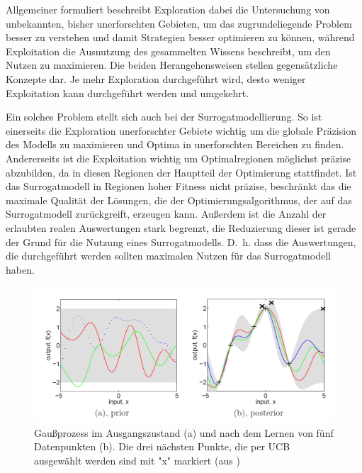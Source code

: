 Allgemeiner formuliert beschreibt Exploration dabei die Untersuchung von unbekannten, bisher unerforschten Gebieten, um das zugrundeliegende Problem besser zu verstehen und damit Strategien besser optimieren zu können, während Exploitation die Ausnutzung des gesammelten Wissens beschreibt, um den Nutzen zu maximieren.
Die beiden Herangehensweisen stellen gegensätzliche Konzepte dar.
Je mehr Exploration durchgeführt wird, desto weniger Exploitation kann durchgeführt werden und umgekehrt.

Ein solches Problem stellt sich auch bei der Surrogatmodellierung.
So ist einerseits die Exploration unerforschter Gebiete wichtig um die globale Präzision des Modells zu maximieren und Optima in unerforschten Bereichen zu finden.
Andererseits ist die Exploitation wichtig um Optimalregionen möglichst präzise abzubilden, da in diesen Regionen der Hauptteil der Optimierung stattfindet.
Ist das Surrogatmodell in Regionen hoher Fitness nicht präzise, beschränkt das die maximale Qualität der Lösungen, die der Optimierungsalgorithmus, der auf das Surrogatmodell zurückgreift, erzeugen kann.
Außerdem ist die Anzahl der erlaubten realen Auswertungen stark begrenzt, die Reduzierung dieser ist gerade der Grund für die Nutzung eines Surrogatmodells.
D.~h. dass die Auswertungen, die durchgeführt werden sollten maximalen Nutzen für das Surrogatmodell haben.

\begin{figure}[h]
	\centering
	\includegraphics[width=1\linewidth]{bilder/ucb}
	\caption[Gaußprozess im Ausgangszustand (a) und nach dem Lernen von fünf Datenpunkten (b).]{Gaußprozess im Ausgangszustand (a) und nach dem Lernen von fünf Datenpunkten (b). Die drei nächsten Punkte, die per UCB ausgewählt werden sind mit "x" markiert (aus \cite{Rasmussen.2008})}
	\label{fig:ucb}
\end{figure}

